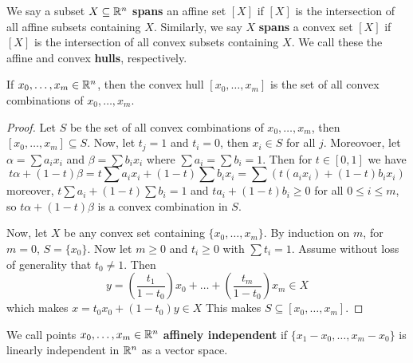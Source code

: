 \begin{definition}
    We say a subset $X \subseteq \mathbb{R}^n$  \textbf{spans} an affine set $[X]$ if
    $[X]$ is the intersection of all affine subsets containing $X$. Similarly,
    we say  $X$  \textbf{spans} a convex set $[X]$ if $[X]$ is the intersection
    of all convex subsets containing $X$. We call these the affine and convex
    \textbf{hulls}, respectively.
\end{definition}

\begin{theorem}\label{3.1.3}
    If $x_0, \dots, x_m \in \mathbb{R}^n$, then the convex hull $[x_0, \dots, x_m]$ is
    the set of all convex combinations of $x_0, \dots, x_m$.
\end{theorem}
\begin{proof}
    Let $S$ be the set of all convex combinations of  $x_0, \dots, x_m$, then
    $[x_0, \dots, x_m] \subseteq S$. Now, let $t_j=1$ and $t_i=0$, then  $x_i
    \in S$ for all  $j$. Moreovoer, let  $\alpha=\sum{a_ix_i}$ and
    $\beta=\sum{b_ix_i}$ where $\sum{a_i}=\sum{b_i}=1$. Then for $t \in [0,1]$
    we have
    \begin{equation*}
        t\alpha+(1-t)\beta=t\sum{a_ix_i}+(1-t)\sum{b_ix_i}=\sum{(t(a_ix_i)+(1-t)b_ix_i)}
    \end{equation*}
    moreover, $t\sum{a_i}+(1-t)\sum{b_i}=1$ and $ta_i+(1-t)b_i \geq 0$ for all
    $0 \leq i \leq m$, so  $t\alpha+(1-t)\beta$ is a convex combination in $S$.

    Now, let  $X$ be any convex set containing  $\{x_0, \dots, x_m\}$. By
    induction on $m$, for  $m=0$,  $S=\{x_0\}$. Now let $m \geq 0$ and  $t_i
    \geq 0$ with  $\sum{t_i}=1$. Assume without loss of generality that $t_0
    \neq 1$. Then
    \begin{equation*}
        y=(\frac{t_1}{1-t_0})x_0+\dots+(\frac{t_m}{1-t_0})x_m \in X
    \end{equation*}
    which makes $x=t_0x_0+(1-t_0)y \in X$ This makes $S \subseteq [x_0, \dots,
    x_m]$.
\end{proof}

\begin{definition}
    We call points $x_0, \dots, x_m \in \mathbb{R}^n$ \textbf{affinely independent} if
    $\{x_1-x_0, \dots, x_m-x_0\}$ is linearly independent in $\mathbb{R}^n$ as a vector
    space.
\end{definition}
